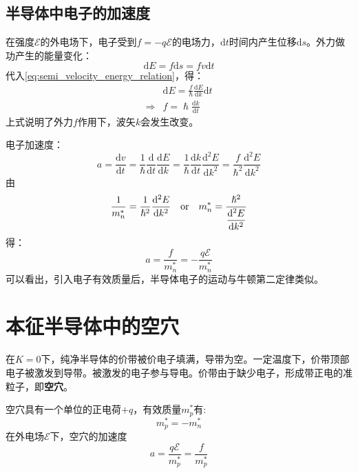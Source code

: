 \subsection{半导体中电子的加速度}

在强度$\mathscr{E}$的外电场下，电子受到$f=-q\mathscr{E}$的电场力，$\mathrm{d}t$时间内产生位移$\mathrm{d}s$。外力做功产生的能量变化：
\begin{equation}
    \mathrm{d}E=f\mathrm{d}s=fv\mathrm{d}t
\end{equation}
代入\autoref{eq:semi_velocity_energy_relation}，得：
\begin{align}
    &\mathrm{d}E=\frac{f}{\hslash}\frac{\mathrm{d}E}{\mathrm{d}k}\mathrm{d}t\\
    \Longrightarrow&f=\hslash\frac{\mathrm{d}k}{\mathrm{d}t}\label{eq:force_k_t_relation}
\end{align}
上式说明了外力$f$作用下，波矢$k$会发生改变。

电子加速度：
\begin{equation}
    a=\frac{\mathrm{d}v}{\mathrm{d}t}=\frac{1}{\hslash}\frac{\mathrm{d}}{\mathrm{d}t}\frac{\mathrm{d}E}{\mathrm{d}k}=\frac{1}{\hslash}\frac{\mathrm{d}k}{\mathrm{d}t}\frac{\mathrm{d}^2E}{\mathrm{d}k^2}=\frac{f}{\hslash^2}\frac{\mathrm{d}^2E}{\mathrm{d}k^2}
\end{equation}
由
\begin{equation}
    \frac{1}{m_n^*}=\frac{1}{\hslash^2}\frac{\mathrm{d}^2E}{\mathrm{d}k^2}\quad \text{or}\quad m_n^*=\frac{\hslash^2}{\displaystyle\frac{\mathrm{d}^2E}{\mathrm{d}k^2}}
\end{equation}
\vspace{1ex}得：
\begin{equation}
    a=\frac{f}{m_n^*}=-\frac{q\mathscr{E}}{m_n^*}
    \label{eq:accel_force}
\end{equation}
可以看出，引入电子有效质量后，半导体电子的运动与牛顿第二定律类似。

\section{本征半导体中的空穴}

在$K=0$下，纯净半导体的价带被价电子填满，导带为空。一定温度下，价带顶部电子被激发到导带。被激发的电子参与导电。价带由于缺少电子，形成带正电的准粒子，即\textbf{空穴}。

空穴具有一个单位的正电荷$+q$，有效质量$m_p^*$有:
\begin{equation}
    m_p^*=-m_n^*
\end{equation}
在外电场$\mathscr{E}$下，空穴的加速度
\begin{equation}
    a=\frac{q\mathscr{E}}{m_p^*}=\frac{f}{m_p^*}
\end{equation}

